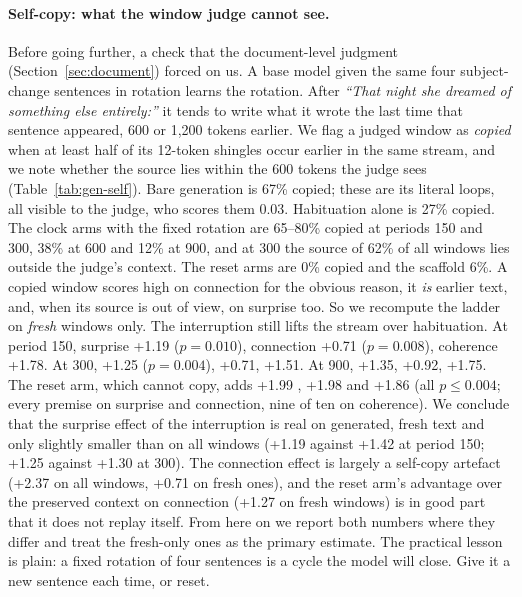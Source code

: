 \paragraph{Self-copy: what the window judge cannot see.} Before going
further, a check that the document-level judgment
(Section~\ref{sec:document}) forced on us. A base model given the same four
subject-change sentences in rotation learns the rotation. After \emph{``That
night she dreamed of something else entirely:''} it tends to write what it
wrote the last time that sentence appeared, 600 or 1,200 tokens earlier. We
flag a judged window as \emph{copied} when at least half of its 12-token
shingles occur earlier in the same stream, and we note whether the source
lies within the 600 tokens the judge sees (Table~\ref{tab:gen-self}). Bare
generation is 67\% copied; these are its literal loops, all visible to the
judge, who scores them 0.03. Habituation alone is 27\% copied. The clock
arms with the fixed rotation are 65--80\% copied at periods 150 and 300, 38\%
at 600 and 12\% at 900, and at 300 the source of 62\% of all windows lies
outside the judge's context. The reset arms are 0\% copied and the scaffold
6\%. A copied window scores high on connection for the obvious reason, it
\emph{is} earlier text, and, when its source is out of view, on surprise
too. So we recompute the ladder on \emph{fresh} windows only. The
interruption still lifts the stream over habituation. At period 150, surprise
+1.19  ($p=0.010$), connection +0.71 
($p=0.008$), coherence +1.78. At 300, +1.25  ($p=0.004$),
+0.71, +1.51. At 900, +1.35, +0.92, +1.75. The reset arm, which cannot copy,
adds +1.99 , +1.98  and +1.86 (all
$p\le0.004$; every premise on surprise and connection, nine of ten on coherence). We conclude that the surprise effect of the
interruption is real on generated, fresh text and only slightly smaller than
on all windows (+1.19 against +1.42 at period 150; +1.25 against +1.30 at
300). The connection effect is largely a self-copy artefact (+2.37 on all
windows, +0.71 on fresh ones), and the reset arm's advantage over the
preserved context on connection (+1.27  on fresh windows)
is in good part that it does not replay itself. From here on we report both
numbers where they differ and treat the fresh-only ones as the primary
estimate. The practical lesson is plain: a fixed rotation of
four sentences is a cycle the model will close. Give it a new sentence each
time, or reset.

